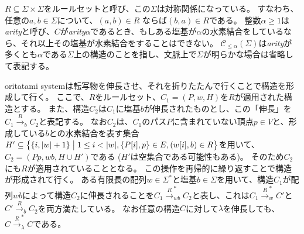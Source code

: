 \documentclass[a4,11pt]{article}
\begin{document}
$R \subseteq \Sigma \times \Sigma$をルールセットと呼び、この$\Sigma$は対称関係になっている。
すなわち、任意の$a, b \in \Sigma$について、$(a, b) \in R$ ならば$(b, a) \in R$である。
整数$\alpha \ge 1$は\textit{arity}と呼び、$C$が\textit{arity}$\alpha$であるとき、もしある塩基が$\alpha$の水素結合をしているなら、それ以上その塩基が水素結合をすることはできない。
$\mathcal{C}_{\le \alpha}(\Sigma)$は\textit{arity}が多くとも$\alpha$である$\Sigma$上の構造のことを指し、文脈上で$\Sigma$が明らかな場合は省略して表記する。


oritatami systemは転写物を伸長させ、それを折りたたんで行くことで構造を形成して行く。
ここで、$R$をルールセット、$C_1 = (P, w, H)$を$R$が適用された構造とする。
また、構造$C_2$は$C_1$に塩基$b$が伸長されたものとし、この「伸長」を$C_1 \xrightarrow{R}_b C_2$と表記する。
なお$C_2$は、$C_1$のパス$P$に含まれていない頂点$p \in V$と、形成している$b$との水素結合を表す集合$H' \subseteq \bigl\{ \{i, |w|+1\} \bigm| 1 \le i < |w|, \{P[i], p\} \in E, (w[i], b) \in R \bigr\}$を用いて、$C_2 = (P p, wb, H \cup H')$である ($H'$は空集合である可能性もある)。
そのため$C_2$にも$R$が適用されていることとなる。
この操作を再帰的に繰り返すことで構造が形成されて行く。
ある有限長の配列$w \in \Sigma^*$と塩基$b \in \Sigma$を用いて、構造$C_1$が配列$wb$によって構造$C_2$に伸長されることを$C_1 \xrightarrow{R}_{wb}^* C_2$と表し、これは$C_1 \xrightarrow{R}_w^* C'$と$C' \xrightarrow{R}_b C_2$を両方満たしている。
なお任意の構造$C$に対して$\lambda$を伸長しても、$C \xrightarrow{R}_\lambda^* C$である。
\end{document}
